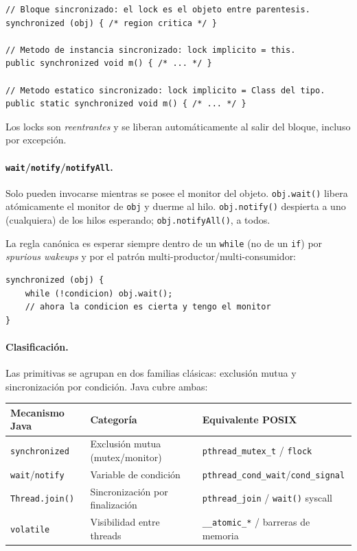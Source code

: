 \documentclass[11pt,a4paper]{article}
\begin{document}
\begin{lstlisting}[style=javastyle]
// Bloque sincronizado: el lock es el objeto entre parentesis.
synchronized (obj) { /* region critica */ }

// Metodo de instancia sincronizado: lock implicito = this.
public synchronized void m() { /* ... */ }

// Metodo estatico sincronizado: lock implicito = Class del tipo.
public static synchronized void m() { /* ... */ }
\end{lstlisting}

Los locks son \emph{reentrantes} y se liberan automáticamente al salir
del bloque, incluso por excepción.

\paragraph{\texttt{wait}/\texttt{notify}/\texttt{notifyAll}.} Solo
pueden invocarse mientras se posee el monitor del objeto.
\texttt{obj.wait()} libera atómicamente el monitor de \texttt{obj} y
duerme al hilo. \texttt{obj.notify()} despierta a uno (cualquiera) de
los hilos esperando; \texttt{obj.notifyAll()}, a todos.

La regla canónica es esperar siempre dentro de un \texttt{while} (no
de un \texttt{if}) por \emph{spurious wakeups} y por el patrón
multi-productor/multi-consumidor:

\begin{lstlisting}[style=javastyle]
synchronized (obj) {
    while (!condicion) obj.wait();
    // ahora la condicion es cierta y tengo el monitor
}
\end{lstlisting}

\paragraph{Clasificación.} Las primitivas se agrupan en dos familias
clásicas: exclusión mutua y sincronización por condición. Java cubre
ambas:

\begin{center}
\small
\begin{tabular}{@{}lll@{}}
\toprule
Mecanismo Java & Categoría & Equivalente POSIX \\
\midrule
\texttt{synchronized} & Exclusión mutua (mutex/monitor) & \texttt{pthread\_mutex\_t} / \texttt{flock} \\
\texttt{wait}/\texttt{notify} & Variable de condición & \texttt{pthread\_cond\_wait}/\texttt{cond\_signal} \\
\texttt{Thread.join()} & Sincronización por finalización & \texttt{pthread\_join} / \texttt{wait()} syscall \\
\texttt{volatile} & Visibilidad entre threads & \texttt{\_\_atomic\_*} / barreras de memoria \\
\bottomrule
\end{tabular}
\end{center}
\end{document}
